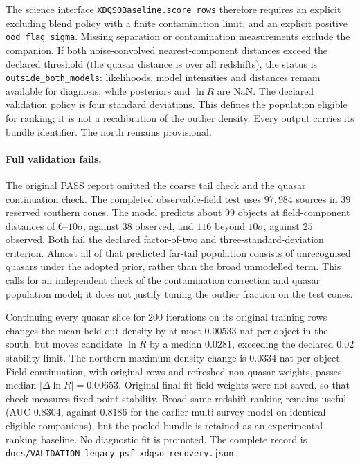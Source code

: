 \documentclass[11pt,a4paper]{article}
\begin{document}
The science interface \texttt{XDQSOBaseline.score\_rows} therefore requires an
explicit excluding blend policy with a finite contamination limit, and an
explicit positive \texttt{ood\_flag\_sigma}. Missing separation or contamination
measurements exclude the companion. If both noise-convolved nearest-component
distances exceed the declared threshold (the quasar distance is over all
redshifts), the status is \texttt{outside\_both\_models}: likelihoods, model
intensities and distances remain available for diagnosis, while posteriors and
$\ln R$ are NaN. The declared validation policy is four standard deviations.
This defines the population eligible for ranking; it is not a recalibration of
the outlier density. Every output carries its bundle identifier. The north
remains provisional.

\paragraph{Full validation fails.} The original PASS report omitted the coarse
tail check and the quasar continuation check. The completed observable-field
test uses $97{,}984$ sources in $39$ reserved southern cones. The model predicts
about $99$ objects at field-component distances of $6$--$10\sigma$, against
$38$ observed, and $116$ beyond $10\sigma$, against $25$ observed. Both fail
the declared factor-of-two and three-standard-deviation criterion. Almost all
of that predicted far-tail population consists of unrecognised quasars under
the adopted prior, rather than the broad unmodelled term. This calls for an
independent check of the contamination correction and quasar population model;
it does not justify tuning the outlier fraction on the test cones.

Continuing every quasar slice for $200$ iterations on its original training
rows changes the mean held-out density by at most $0.00533$ nat per object in
the south, but moves candidate $\ln R$ by a median $0.0281$, exceeding the
declared $0.02$ stability limit. The northern maximum density change is
$0.0334$ nat per object. Field continuation, with original rows and refreshed
non-quasar weights, passes: median $|\Delta\ln R|=0.00653$. Original final-fit
field weights were not saved, so that check measures fixed-point stability.
Broad same-redshift ranking remains useful (AUC $0.8304$, against $0.8186$
for the earlier multi-survey model on identical eligible companions), but the
pooled bundle is retained as an experimental ranking baseline. No diagnostic
fit is promoted. The complete record is
\texttt{docs/VALIDATION\_legacy\_psf\_xdqso\_recovery.json}.
\end{document}
